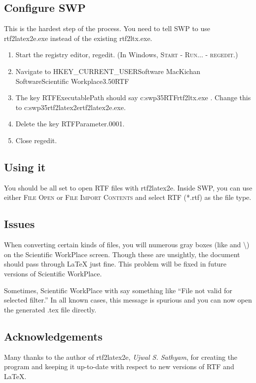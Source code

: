 \documentclass{article}
\begin{document}
\subsection{Configure SWP}

This is the hardest step of the process. You need to tell SWP to use \textsf{%
rtf2latex2e.exe} instead of the existing \textsf{rtf2ltx.exe}.

\begin{enumerate}
\item Start the registry editor, \textsf{regedit}. (In Windows, \textsc{%
Start - Run... - regedit}.)

\item Navigate to \textsf{HKEY\_CURRENT\_USER\TEXTsymbol{\backslash}Software%
\TEXTsymbol{\backslash}MacKichan Software\TEXTsymbol{\backslash}Scientific
Workplace\TEXTsymbol{\backslash}3.50\TEXTsymbol{\backslash}RTF}

\item The key \textsf{RTFExecutablePath} should say \textsf{c:\TEXTsymbol{%
\backslash}swp35\TEXTsymbol{\backslash}RTF\TEXTsymbol{\backslash}rtf2ltx.exe}%
. Change this to \textsf{c:\TEXTsymbol{\backslash}swp35\TEXTsymbol{\backslash%
}rtf2latex2e\TEXTsymbol{\backslash}rtf2latex2e.exe}.

\item Delete the key \textsf{RTFParameter.0001}.

\item Close \textsf{regedit}.
\end{enumerate}

\subsection{Using it}

You should be all set to open RTF files with \textsf{rtf2latex2e}. Inside
SWP, you can use either \textsc{File Open} or \textsc{File Import Contents}
and select \textsf{RTF (*.rtf)} as the file type.

\subsection{Issues}

When converting certain kinds of files, you will numerous gray boxes (like {%
\textquotedbl and \textbackslash}) on the Scientific WorkPlace screen.
Though these are unsightly, the document should pass through LaTeX just
fine. This problem will be fixed in future versions of Scientific WorkPlace.

Sometimes, Scientific WorkPlace with say something like ``File not valid for
selected filter.'' In all known cases, this message is spurious and you can
now open the generated .tex file directly.

\subsection{Acknowledgements}

Many thanks to the author of rtf2latex2e, \textsl{Ujwal S. Sathyam}, for
creating the program and keeping it up-to-date with respect to new versions
of RTF and LaTeX.
\end{document}
